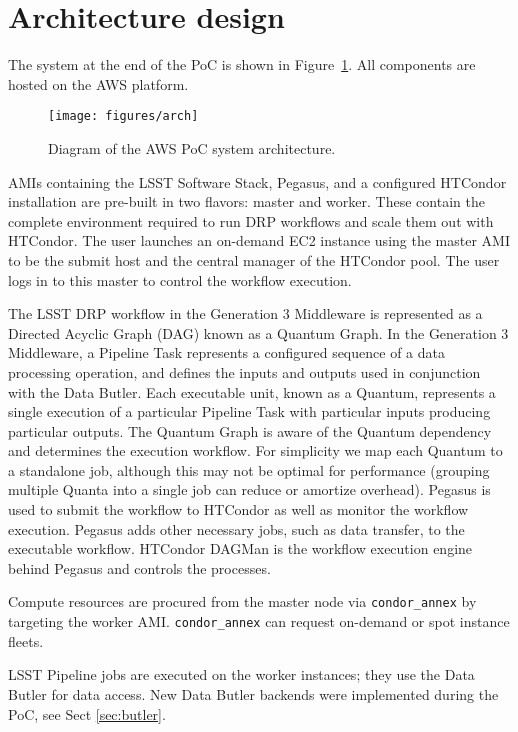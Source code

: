 \section{Architecture design} \label{sec:arch}


The system at the end of the PoC is shown in Figure~\ref{fig:arch}.
All components are hosted on the AWS platform.

\begin{figure}
  \centering
  \texttt{[image: figures/arch]}
  \label{fig:arch}
  \caption{Diagram of the AWS PoC system architecture.}
\end{figure}

AMIs containing the LSST Software Stack, Pegasus, and a configured HTCondor installation are pre-built in two flavors: master and worker.
These contain the complete environment required to run DRP workflows and scale them out with HTCondor.
The user launches an on-demand EC2 instance using the master AMI to be the submit host and the central manager of the HTCondor pool.
The user logs in to this master to control the workflow execution.

The LSST DRP workflow in the Generation 3 Middleware is represented as a Directed Acyclic Graph (DAG) known as a Quantum Graph.
In the Generation 3 Middleware, a Pipeline Task represents a configured sequence of a data processing operation, and defines the inputs and outputs used in conjunction with the Data Butler.
Each executable unit, known as a Quantum, represents a single execution of a particular Pipeline Task with particular inputs producing particular outputs.
The Quantum Graph is aware of the Quantum dependency and determines the execution workflow.
For simplicity we map each Quantum to a standalone job, although this may not be optimal for performance (grouping multiple Quanta into a single job can reduce or amortize overhead).
Pegasus is used to submit the workflow to HTCondor as well as monitor the workflow execution.
Pegasus adds other necessary jobs, such as data transfer, to the executable workflow.
HTCondor DAGMan is the workflow execution engine behind Pegasus and controls the processes.

Compute resources are procured from the master node via \texttt{condor\_annex} by targeting the worker AMI.
\texttt{condor\_annex} can request on-demand or spot instance fleets.

LSST Pipeline jobs are executed on the worker instances; they use the Data Butler for data access.
New Data Butler backends were implemented during the PoC, see Sect \ref{sec:butler}.

